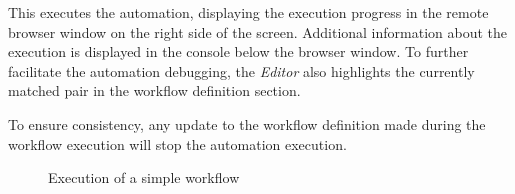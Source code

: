 This executes the automation, displaying the execution progress in the remote browser window on the right side of the screen.
Additional information about the execution is displayed in the console below the browser window.
To further facilitate the automation debugging, the \textit{Editor} also highlights the currently matched pair in the workflow definition section.

To ensure consistency, any update to the workflow definition made during the workflow execution will stop the automation execution.

\begin{figure}[!h]
    \begin{center}
    \end{center}
    \caption{Execution of a simple workflow}
\end{figure}